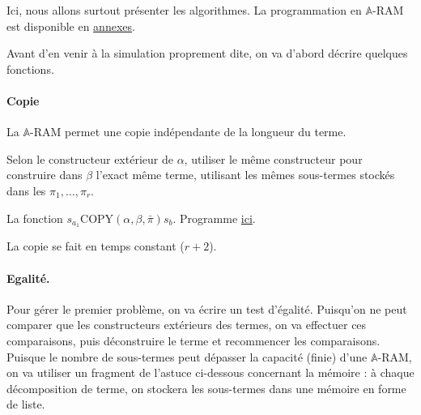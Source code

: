 \documentclass{report}
\newcommand{\bbA}{\mathbb{A}}
\begin{document}
				\begin{demo}
					Ici, nous allons surtout présenter les algorithmes. La programmation en $\bbA$-RAM est disponible en \hyperref[sec:annexes_programmes]{annexes}.
					
					Avant d'en venir à la simulation proprement dite, on va d'abord décrire quelques fonctions.
			
					
					\paragraph{Copie}
					
					La $\bbA$-RAM permet une copie indépendante de la longueur du terme. 
					
					\espace 
					
					\begin{algorithm}[H]
						\label{algo:A_RAM_fn_COPY}
						
							
						Selon le constructeur extérieur de $\alpha$, utiliser le même constructeur pour construire dans $\beta$ l'exact même terme, utilisant les mêmes sous-termes stockés dans les $\pi_1, \dots, \pi_r$.
						
						\caption{La fonction $s_{a_1}\text{COPY}(\alpha, \beta, \bar{\pi}) s_b$. Programme \hyperref[prog:A_RAM_fn_COPY]{ici}.}
					\end{algorithm}
						
					\espace
					
					La copie se fait en temps constant ($r+2$).
					
	
					\paragraph{Egalité.}
					Pour gérer le premier problème, on va écrire un test d'égalité. Puisqu'on ne peut comparer que les constructeurs extérieurs des termes, on va effectuer ces comparaisons, puis déconstruire le terme et recommencer les comparaisons. Puisque le nombre de sous-termes peut dépasser la capacité (finie) d'une $\bbA$-RAM, on va utiliser un fragment de l'astuce ci-dessous concernant la mémoire : à chaque décomposition de terme, on stockera les sous-termes dans une mémoire en forme de liste. 
	

\end{demo}
\end{document}
